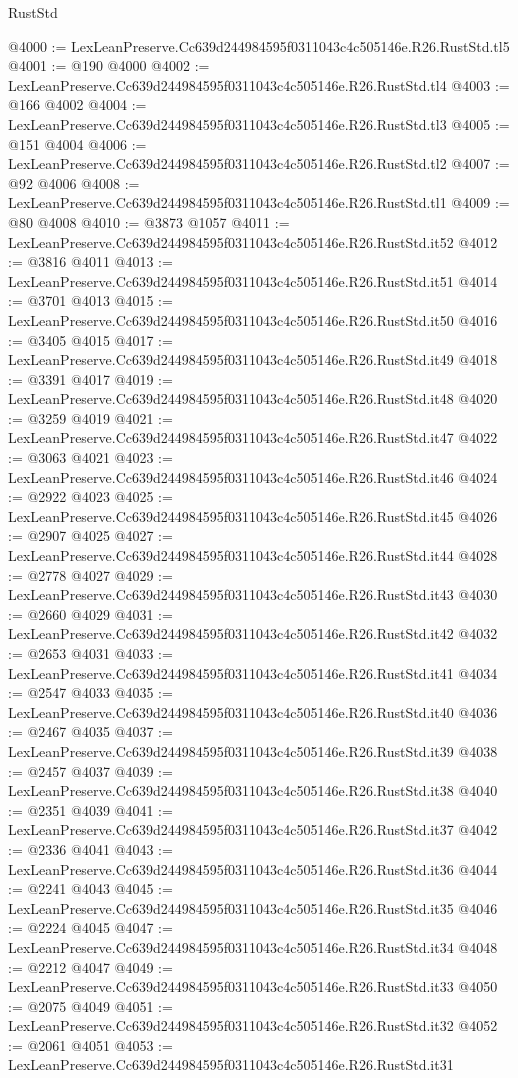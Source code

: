 \begin{lexlean}{RustStd}
\begin{coremodule}
@4000 := LexLeanPreserve.Cc639d244984595f0311043c4c505146e.R26.RustStd.tl5
@4001 := @190 @4000
@4002 := LexLeanPreserve.Cc639d244984595f0311043c4c505146e.R26.RustStd.tl4
@4003 := @166 @4002
@4004 := LexLeanPreserve.Cc639d244984595f0311043c4c505146e.R26.RustStd.tl3
@4005 := @151 @4004
@4006 := LexLeanPreserve.Cc639d244984595f0311043c4c505146e.R26.RustStd.tl2
@4007 := @92 @4006
@4008 := LexLeanPreserve.Cc639d244984595f0311043c4c505146e.R26.RustStd.tl1
@4009 := @80 @4008
@4010 := @3873 @1057
@4011 := LexLeanPreserve.Cc639d244984595f0311043c4c505146e.R26.RustStd.it52
@4012 := @3816 @4011
@4013 := LexLeanPreserve.Cc639d244984595f0311043c4c505146e.R26.RustStd.it51
@4014 := @3701 @4013
@4015 := LexLeanPreserve.Cc639d244984595f0311043c4c505146e.R26.RustStd.it50
@4016 := @3405 @4015
@4017 := LexLeanPreserve.Cc639d244984595f0311043c4c505146e.R26.RustStd.it49
@4018 := @3391 @4017
@4019 := LexLeanPreserve.Cc639d244984595f0311043c4c505146e.R26.RustStd.it48
@4020 := @3259 @4019
@4021 := LexLeanPreserve.Cc639d244984595f0311043c4c505146e.R26.RustStd.it47
@4022 := @3063 @4021
@4023 := LexLeanPreserve.Cc639d244984595f0311043c4c505146e.R26.RustStd.it46
@4024 := @2922 @4023
@4025 := LexLeanPreserve.Cc639d244984595f0311043c4c505146e.R26.RustStd.it45
@4026 := @2907 @4025
@4027 := LexLeanPreserve.Cc639d244984595f0311043c4c505146e.R26.RustStd.it44
@4028 := @2778 @4027
@4029 := LexLeanPreserve.Cc639d244984595f0311043c4c505146e.R26.RustStd.it43
@4030 := @2660 @4029
@4031 := LexLeanPreserve.Cc639d244984595f0311043c4c505146e.R26.RustStd.it42
@4032 := @2653 @4031
@4033 := LexLeanPreserve.Cc639d244984595f0311043c4c505146e.R26.RustStd.it41
@4034 := @2547 @4033
@4035 := LexLeanPreserve.Cc639d244984595f0311043c4c505146e.R26.RustStd.it40
@4036 := @2467 @4035
@4037 := LexLeanPreserve.Cc639d244984595f0311043c4c505146e.R26.RustStd.it39
@4038 := @2457 @4037
@4039 := LexLeanPreserve.Cc639d244984595f0311043c4c505146e.R26.RustStd.it38
@4040 := @2351 @4039
@4041 := LexLeanPreserve.Cc639d244984595f0311043c4c505146e.R26.RustStd.it37
@4042 := @2336 @4041
@4043 := LexLeanPreserve.Cc639d244984595f0311043c4c505146e.R26.RustStd.it36
@4044 := @2241 @4043
@4045 := LexLeanPreserve.Cc639d244984595f0311043c4c505146e.R26.RustStd.it35
@4046 := @2224 @4045
@4047 := LexLeanPreserve.Cc639d244984595f0311043c4c505146e.R26.RustStd.it34
@4048 := @2212 @4047
@4049 := LexLeanPreserve.Cc639d244984595f0311043c4c505146e.R26.RustStd.it33
@4050 := @2075 @4049
@4051 := LexLeanPreserve.Cc639d244984595f0311043c4c505146e.R26.RustStd.it32
@4052 := @2061 @4051
@4053 := LexLeanPreserve.Cc639d244984595f0311043c4c505146e.R26.RustStd.it31

\end{coremodule}
\end{lexlean}
